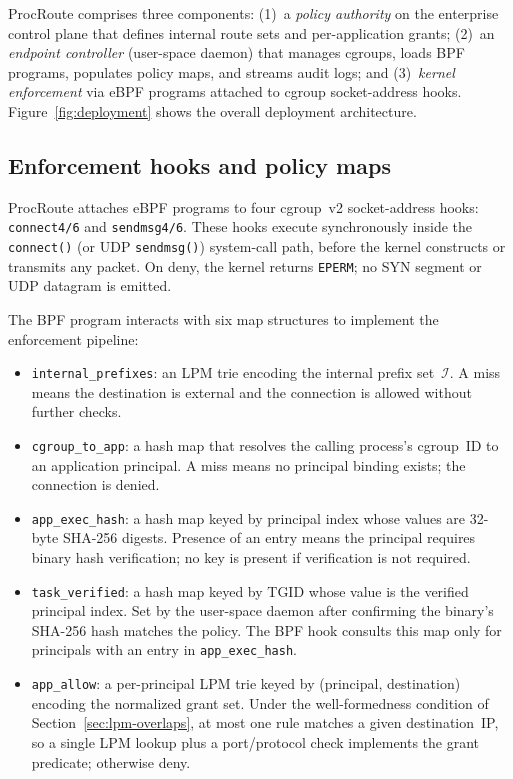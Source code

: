 \documentclass[sigconf]{acmart}
\begin{document}
ProcRoute comprises three components: (1)~a \emph{policy authority}
on the enterprise control plane that defines internal route sets and
per-application grants; (2)~an \emph{endpoint controller} (user-space
daemon) that manages cgroups, loads BPF programs, populates policy
maps, and streams audit logs; and (3)~\emph{kernel enforcement}
via eBPF programs attached to cgroup socket-address hooks.
Figure~\ref{fig:deployment} shows the overall deployment
architecture.

\subsection{Enforcement hooks and policy maps}
\label{sec:lifecycle}

ProcRoute attaches eBPF programs to four cgroup~v2
socket-address hooks: \texttt{connect4/6} and
\texttt{sendmsg4/6}.
These hooks execute synchronously inside the
\texttt{connect()} (or UDP \texttt{sendmsg()}) system-call
path, before the kernel constructs or transmits any packet.
On deny, the kernel returns \texttt{EPERM}; no SYN
segment or UDP datagram is emitted.

The BPF program interacts with six map structures to implement the
enforcement pipeline:

\begin{itemize}
  \item \texttt{internal\_prefixes}: an LPM trie encoding the
    internal prefix set~$\mathcal{I}$.  A miss means the destination
    is external and the connection is allowed without further checks.
  \item \texttt{cgroup\_to\_app}: a hash map that resolves the
    calling process's cgroup~ID to an application principal.
    A miss means no principal binding exists; the connection is
    denied.
  \item \texttt{app\_exec\_hash}: a hash map keyed by principal
    index whose values are 32-byte SHA-256 digests.  Presence of
    an entry means the principal requires binary hash
    verification; no key is present if verification is not
    required.
  \item \texttt{task\_verified}: a hash map keyed by TGID whose value is the verified
    principal index.  Set by the user-space daemon after
    confirming the binary's SHA-256 hash matches the policy.
    The BPF hook consults this map only for principals with an
    entry in \texttt{app\_exec\_hash}.
  \item \texttt{app\_allow}: a per-principal LPM
    trie keyed by (principal, destination) encoding
    the normalized grant set.  Under the
    well-formedness condition of
    Section~\ref{sec:lpm-overlaps}, at most one rule
    matches a given destination~IP, so a single LPM
    lookup plus a port/protocol check implements the
    grant predicate; otherwise deny.
\end{itemize}
\end{document}
